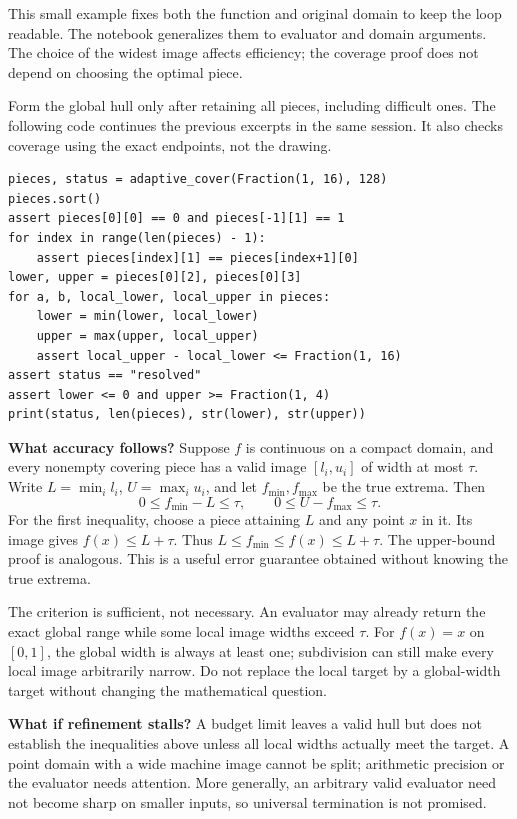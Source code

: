 This small example fixes both the function and original domain to keep the
loop readable. The notebook generalizes them to evaluator and domain arguments.
The choice of the widest image affects efficiency; the coverage proof does not
depend on choosing the optimal piece.

\newpage
{}
Form the global hull only after retaining all pieces, including difficult
ones. The following code continues the previous excerpts in the same session.
It also checks coverage using the exact endpoints, not the drawing.
\begin{lstlisting}
pieces, status = adaptive_cover(Fraction(1, 16), 128)
pieces.sort()
assert pieces[0][0] == 0 and pieces[-1][1] == 1
for index in range(len(pieces) - 1):
    assert pieces[index][1] == pieces[index+1][0]
lower, upper = pieces[0][2], pieces[0][3]
for a, b, local_lower, local_upper in pieces:
    lower = min(lower, local_lower)
    upper = max(upper, local_upper)
    assert local_upper - local_lower <= Fraction(1, 16)
assert status == "resolved"
assert lower <= 0 and upper >= Fraction(1, 4)
print(status, len(pieces), str(lower), str(upper))
\end{lstlisting}

\textbf{What accuracy follows?} Suppose $f$ is continuous on a compact
domain, and every nonempty covering piece has a valid image $[l_i,u_i]$
of width at most $\tau$. Write $L=\min_i l_i$, $U=\max_i u_i$, and let
$f_{\min},f_{\max}$ be the true extrema. Then
\[
       0\le f_{\min}-L\le\tau,\qquad
       0\le U-f_{\max}\le\tau.
\]
For the first inequality, choose a piece attaining $L$ and any point $x$ in
it. Its image gives $f(x)\le L+\tau$. Thus
$L\le f_{\min}\le f(x)\le L+\tau$. The upper-bound proof is analogous.
This is a useful error guarantee obtained without knowing the true extrema.

The criterion is sufficient, not necessary. An evaluator may already return
the exact global range while some local image widths exceed $\tau$. For
$f(x)=x$ on $[0,1]$, the global width is always at least one; subdivision
can still make every local image arbitrarily narrow. Do not replace the
local target by a global-width target without changing the mathematical question.

\textbf{What if refinement stalls?} A budget limit leaves a valid hull but
does not establish the inequalities above unless all local widths actually
meet the target. A point domain with a wide machine image cannot be split;
arithmetic precision or the evaluator needs attention. More generally, an
arbitrary valid evaluator need not become sharp on smaller inputs, so universal
termination is not promised.

